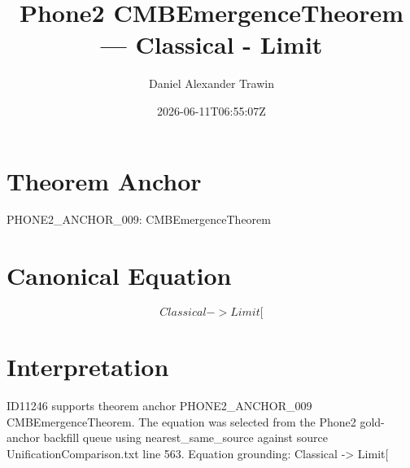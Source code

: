 \documentclass[11pt]{article}
\title{Phone2 CMBEmergenceTheorem — Classical - Limit}
\author{Daniel Alexander Trawin}
\date{2026-06-11T06:55:07Z}
\begin{document}
\maketitle
\section*{Theorem Anchor}
PHONE2_ANCHOR_009: CMBEmergenceTheorem
\section*{Canonical Equation}
\[
Classical -> Limit[
\]
\section*{Interpretation}
ID11246 supports theorem anchor PHONE2_ANCHOR_009 CMBEmergenceTheorem. The equation was selected from the Phone2 gold-anchor backfill queue using nearest_same_source against source UnificationComparison.txt line 563. Equation grounding: Classical -> Limit[
\end{document}
